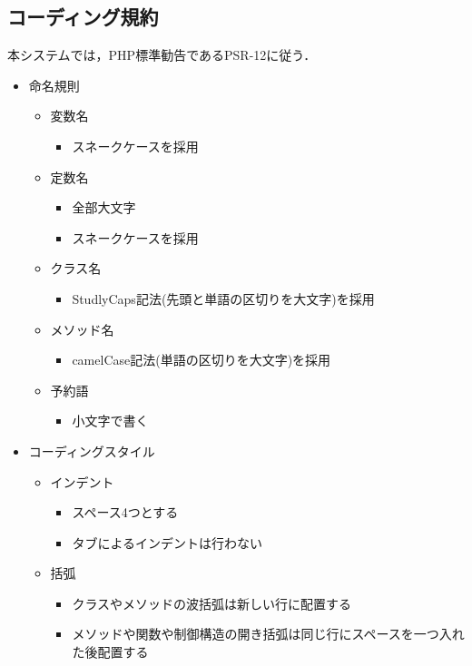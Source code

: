 \documentclass[a4paper, titlepage]{jsarticle}
\begin{document}
\subsection{コーディング規約}
本システムでは，PHP標準勧告であるPSR-12に従う．
\begin{itemize}
  \item 命名規則
  \begin{itemize}
    \item 変数名
    \begin{itemize}
      \item スネークケースを採用
    \end{itemize}
    \item 定数名
    \begin{itemize}
      \item 全部大文字
      \item スネークケースを採用
    \end{itemize}
    \item クラス名
    \begin{itemize}
      \item StudlyCaps記法(先頭と単語の区切りを大文字)を採用
    \end{itemize}
    \item メソッド名
    \begin{itemize}
      \item camelCase記法(単語の区切りを大文字)を採用
    \end{itemize}
    \item 予約語
    \begin{itemize}
      \item 小文字で書く
    \end{itemize}
  \end{itemize}
  \item コーディングスタイル
  \begin{itemize}
    \item インデント
    \begin{itemize}
      \item スペース4つとする
      \item タブによるインデントは行わない
    \end{itemize}
    \item 括弧
    \begin{itemize}
      \item クラスやメソッドの波括弧は新しい行に配置する
      \item メソッドや関数や制御構造の開き括弧は同じ行にスペースを一つ入れた後配置する

\end{itemize}
\end{itemize}
\end{itemize}
\end{document}
